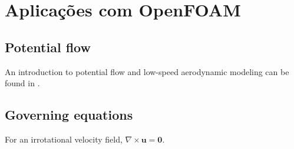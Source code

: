 \chapter{Aplicações com OpenFOAM}
\ChapterTOC

\section{Potential flow}
An introduction to potential flow and low-speed aerodynamic modeling can be found in \cite{katz2001}.

\section{Governing equations}
For an irrotational velocity field, $\nabla\times\mathbf{u}=\mathbf{0}$.

\ChapterReferences
